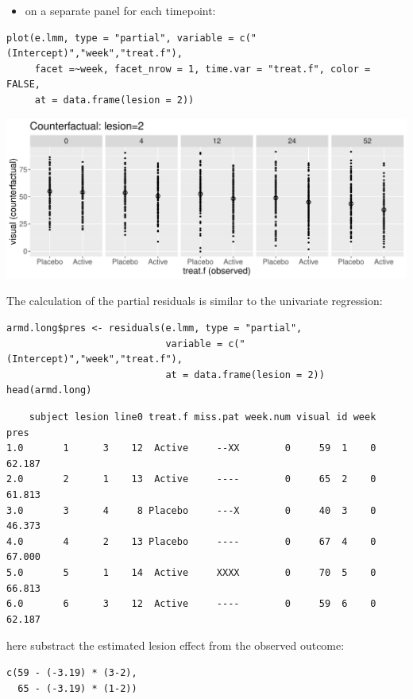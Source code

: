 \documentclass[12pt]{article}
\begin{document}
\begin{itemize}
\item on a separate panel for each timepoint:
\end{itemize}
\lstset{language=r,label= ,caption= ,captionpos=b,numbers=none}
\begin{lstlisting}
plot(e.lmm, type = "partial", variable = c("(Intercept)","week","treat.f"),
     facet =~week, facet_nrow = 1, time.var = "treat.f", color = FALSE,
     at = data.frame(lesion = 2))
\end{lstlisting}

\begin{center}
\includegraphics[trim={0 0 0 0},width=1\textwidth]{./figures/gg-lmm-presFacet.pdf}
\end{center}

The calculation of the partial residuals is similar to the univariate regression:
\lstset{language=r,label= ,caption= ,captionpos=b,numbers=none}
\begin{lstlisting}
armd.long$pres <- residuals(e.lmm, type = "partial", 
                            variable = c("(Intercept)","week","treat.f"),
                            at = data.frame(lesion = 2))
head(armd.long)
\end{lstlisting}

\begin{verbatim}
    subject lesion line0 treat.f miss.pat week.num visual id week   pres
1.0       1      3    12  Active     --XX        0     59  1    0 62.187
2.0       2      1    13  Active     ----        0     65  2    0 61.813
3.0       3      4     8 Placebo     ---X        0     40  3    0 46.373
4.0       4      2    13 Placebo     ----        0     67  4    0 67.000
5.0       5      1    14  Active     XXXX        0     70  5    0 66.813
6.0       6      3    12  Active     ----        0     59  6    0 62.187
\end{verbatim}


here substract the estimated lesion effect from the observed outcome:
\lstset{language=r,label= ,caption= ,captionpos=b,numbers=none}
\begin{lstlisting}
c(59 - (-3.19) * (3-2),
  65 - (-3.19) * (1-2))
\end{lstlisting}
\end{document}
